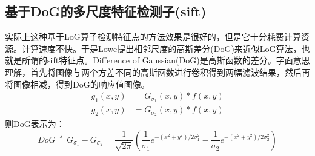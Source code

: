 \subsection{基于DoG的多尺度特征检测子(sift)}
实际上这种基于LoG算子检测特征点的方法效果是很好的，但是它十分耗费计算资源。计算速度不快。于是Lowe\cite{lowe2004sift}提出相邻尺度的高斯差分(DoG)来近似LoG算法，也就是所谓的sift特征点。Difference of Gaussian(DoG)是高斯函数的差分。字面意思理解，首先将图像与两个方差不同的高斯函数进行卷积得到两幅滤波结果，然后再将图像相减，得到DoG的响应值图像。
\begin{equation}
\begin{aligned} g_{1}(x, y) &=G_{\sigma_{1}}(x, y) * f(x, y) \\ g_{2}(x, y) &=G_{\sigma_{2}}(x, y) * f(x, y) \end{aligned}
\end{equation}
则DoG表示为：
\begin{equation}
D o G \triangleq G_{\sigma_{1}}-G_{\sigma_{2}}=\frac{1}{\sqrt{2 \pi}}\left(\frac{1}{\sigma_{1}} e^{-\left(x^{2}+y^{2}\right) / 2 \sigma_{1}^{2}}-\frac{1}{\sigma_{2}} e^{-\left(x^{2}+y^{2}\right) / 2 \sigma_{2}^{2}}\right)
\end{equation}
